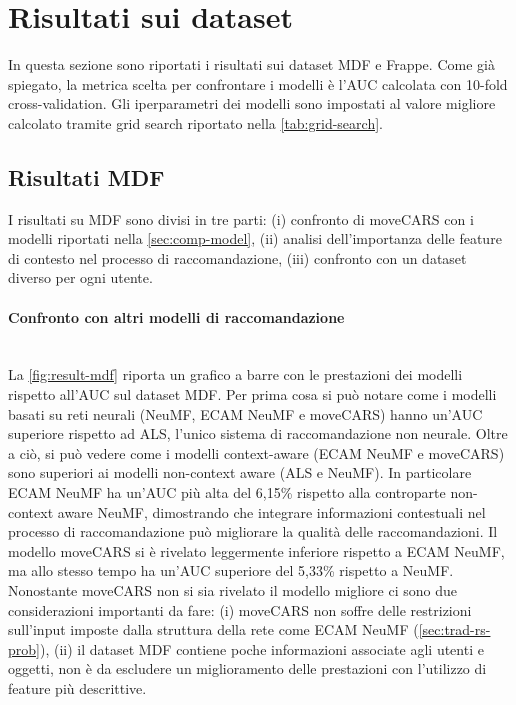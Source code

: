 \documentclass[12pt,italian]{report}
\newcommand{\myparagraph}[1]{\paragraph{#1}\mbox{}\\} %
\begin{document}
\section{Risultati sui dataset} \label{sec:results}
In questa sezione sono riportati i risultati sui dataset MDF e Frappe. Come già spiegato, la metrica scelta per confrontare i modelli è l'AUC calcolata con 10-fold cross-validation. Gli iperparametri dei modelli sono impostati al valore migliore calcolato tramite grid search riportato nella \autoref{tab:grid-search}.
\subsection{Risultati MDF}
I risultati su MDF sono divisi in tre parti: (i) confronto di moveCARS con i modelli riportati nella \autoref{sec:comp-model}, (ii) analisi dell'importanza delle feature di contesto nel processo di raccomandazione, (iii) confronto con un dataset diverso per ogni utente.

\myparagraph{Confronto con altri modelli di raccomandazione}
La \autoref{fig:result-mdf} riporta un grafico a barre con le prestazioni dei modelli rispetto all'AUC sul dataset MDF. Per prima cosa si può notare come i modelli basati su reti neurali (NeuMF, ECAM NeuMF e moveCARS) hanno un'AUC superiore rispetto ad ALS, l'unico sistema di raccomandazione non neurale. Oltre a ciò, si può vedere come i modelli context-aware (ECAM NeuMF e moveCARS) sono superiori ai modelli non-context aware (ALS e NeuMF). In particolare ECAM NeuMF ha un'AUC più alta del 6,15\%  rispetto alla controparte non-context aware NeuMF, dimostrando che integrare informazioni contestuali nel processo di raccomandazione può migliorare la qualità delle raccomandazioni. Il modello moveCARS si è rivelato leggermente inferiore rispetto a ECAM NeuMF, ma allo stesso tempo ha un'AUC superiore del 5,33\% rispetto a NeuMF. Nonostante moveCARS non si sia rivelato il modello migliore ci sono due considerazioni importanti da fare: (i) moveCARS non soffre delle restrizioni sull'input imposte dalla struttura della rete come ECAM NeuMF (\autoref{sec:trad-rs-prob}), (ii) il dataset MDF contiene poche informazioni associate agli utenti e oggetti, non è da escludere un miglioramento delle prestazioni con l'utilizzo di feature più descrittive.
\end{document}
